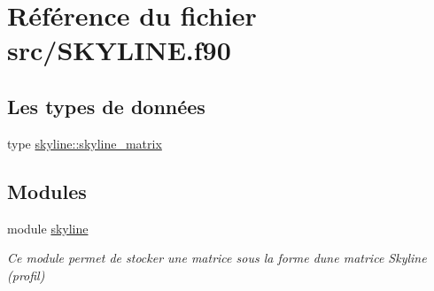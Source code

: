 \hypertarget{_s_k_y_l_i_n_e_8f90}{}\section{Référence du fichier src/\+S\+K\+Y\+L\+I\+NE.f90}
\label{_s_k_y_l_i_n_e_8f90}
\subsection*{Les types de données}
\begin{DoxyCompactItemize}
\item 
type \hyperlink{structskyline_1_1skyline__matrix}{skyline\+::skyline\+\_\+matrix}
\end{DoxyCompactItemize}
\subsection*{Modules}
\begin{DoxyCompactItemize}
\item 
module \hyperlink{namespaceskyline}{skyline}
\begin{DoxyCompactList}\small\item\em Ce module permet de stocker une matrice sous la forme d\textquotesingle{}une matrice Skyline (profil) \end{DoxyCompactList}\end{DoxyCompactItemize}
